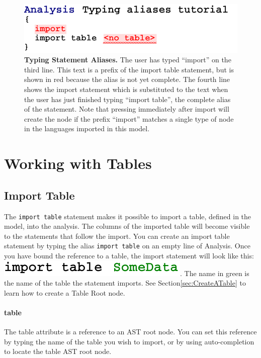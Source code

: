 \begin{figure}[h!tbp]
  \centering
  \includegraphics[width=\figWidthNarrow]{figures/AnalysisTypingAliases.pdf}
\caption[Typing Statement Aliases.]{\textbf{Typing Statement Aliases.} The user has typed ``import'' on the third line. This text is a prefix of the import table statement, but is shown in red because the alias is not yet complete. The fourth line shows the import statement which is substituted to the text when the user has just finished typing ``import table'', the complete alias of the statement. Note that pressing \keys{\return} immediately after import will create the node if the prefix ``import'' matches a single type of node in the languages imported in this model.}
\label{fig:TypingStatementAliases}
\end{figure}

\section{Working with Tables}

\subsection{Import Table}
The \texttt{import table} statement makes it possible to import a table, defined in the model, into the analysis. The columns of the imported table will become visible to the statements that follow the import. You can create an import table statement by typing the alias \texttt{import table} on an empty line of Analysis. Once you have bound the reference to a table, the import statement will look like this: \includegraphics[height=2ex]{figures/SomeDataImportTable.pdf}. The name in green is the name of the table the statement imports. See Section\ref{sec:CreateATable} to learn how to create a Table Root node.
\paragraph{table}

The table attribute is a reference to an AST root node. You can set this reference by typing the name of the table you wish to import, or by using auto-completion \keys{\ctrl+\space} to locate the table AST root node.


